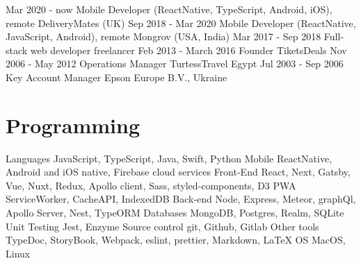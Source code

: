 \documentclass[letterpaper]{twentysecondcv} %
\begin{document}
\begin{twenty} %
	\twentyitem
    	{Mar 2020} 
        {- now}
        {Mobile Developer (ReactNative, TypeScript, Android, iOS), remote}
        {}
        {DeliveryMates (UK)}
        {}	
	\twentyitem
    	{Sep 2018} 
        {- Mar 2020}
        {Mobile Developer (ReactNative, JavaScript, Android), remote}
        {}
        {Mongrov (USA, India)}
        {}
    \twentyitem
    	{Mar 2017}
        {- Sep 2018}
        {Full-stack web developer}
        {}
        {freelancer}
        {}
	\twentyitem
    	{Feb 2013}
        {- March 2016}
        {Founder}
        {}
        {TiketsDeals}
        {}
    \twentyitem
    	{Nov 2006}
        {- May 2012}
        {Operations Manager}
        {}
        {TurtessTravel Egypt}
        {}
    \twentyitem
    	{Jul 2003}
        {- Sep 2006}
        {Key Account Manager}
        {}
        {Epson Europe B.V., Ukraine}
        {}
\end{twenty}


\section{Programming}
\begin{twentyshort} %
    \twentyitemshort
    	{Languages}
    		{JavaScript, TypeScript, Java, Swift, Python}
    \twentyitemshort
    	{Mobile}
        {ReactNative, Android and iOS native, Firebase cloud services}
    \twentyitemshort
    	{Front-End}
        {React, Next, Gatsby, Vue, Nuxt, Redux, Apollo client, Sass, styled-components, D3}
    \twentyitemshort
    	{PWA}
        {ServiceWorker, CacheAPI, IndexedDB}
     \twentyitemshort
    	{Back-end}
		{Node, Express, Meteor, graphQl, Apollo Server, Nest, TypeORM}
     \twentyitemshort
    	{Databases}
		{MongoDB, Postgres, Realm, SQLite}
     \twentyitemshort
    	{Unit Testing}
		{Jest, Enzyme}
     \twentyitemshort
    	{Source control}
		{git, Github, Gitlab}
     \twentyitemshort
    	{Other tools}
		{TypeDoc, StoryBook, Webpack, eslint, prettier, Markdown, \LaTeX}
    \twentyitemshort
    	{OS}
		{MacOS, Linux}
\end{twentyshort}
\end{document}
